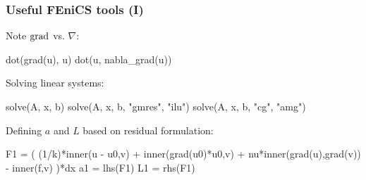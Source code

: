 \begin{frame}[fragile,shrink=5]
  \frametitle{Useful FEniCS tools (I)}
  Note $\operatorname{\mathrm{grad}}$ vs. $\nabla$:
  \vspace{-0.5cm}
  \begin{python}
dot(grad(u), u)
dot(u, nabla_grad(u))
  \end{python}
  Solving linear systems:
  \vspace{-0.5cm}
  \begin{python}
solve(A, x, b)
solve(A, x, b, "gmres", "ilu")
solve(A, x, b, "cg", "amg")
  \end{python}
  Defining $a$ and $L$ based on residual formulation:
  \vspace{-0.5cm}
  \begin{python}
F1 = ( (1/k)*inner(u - u0,v) + inner(grad(u0)*u0,v)
	+ nu*inner(grad(u),grad(v)) - inner(f,v) )*dx
a1 = lhs(F1)
L1 = rhs(F1)
  \end{python}
\end{frame}
